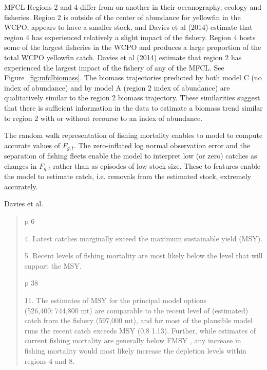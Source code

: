 \documentclass[12pt,letterpaper]{article}
\begin{document}
MFCL Regions 2 and 4 differ from on another in their oceanography,
ecology and fisheries. 
Region 2 is outside of the center of abundance for yellowfin in the
WCPO, appears to have a smaller stock, and Davies et al (2014)
estimate that region 4 has experienced relatively a slight
impact of the fishery.
Region 4 hosts some of the largest fisheries in the WCPO and
produces a large proportion of the total WCPO yellowfin catch.
Davies et al (2014) estimate that region 2 has experienced
the largest impact of the fishery of any of the MFCL.
See Figure~\ref{fig:mfclbiomass}.
The biomass trajectories predicted by both model C (no index of abundance) 
and by model A (region 2 index of abundance) are
qualitatively similar to the region 2 biomass trajectory.
These similarities suggest that there is sufficient information in the
data to estimate a biomass trend similar to region 2 with or without
recourse to an index of abundance.

The random walk representation of fishing mortality enables
to model to compute accurate values of $F_{g,t}$. The zero-inflated
log normal observation error and the separation of fishing fleets
enable the model to interpret low (or zero) catches as changes in
$F_{g,t}$ rather than as episodes of low stock size.
These to features enable the model to estimate catch, i.e. removals
from the estimated stock, extremely accurately.


Davies et al.
\begin{quote}
p 6

4. Latest catches marginally exceed the maximum sustainable yield (MSY).

5. Recent levels of fishing mortality are most likely below the level that will support the MSY.

p 38

11. The estimates of MSY for the principal model options (526,400;744,800 mt) are comparable to the
recent level of (estimated) catch from the fishery (597,000 mt), and for most of the plausible model
runs the recent catch exceeds MSY (0.81.13). Further, while estimates of current fishing mortality
are generally below FMSY , any increase in fishing mortality would most likely increase the depletion
levels within regions 4 and 8.
\end{quote}
 
\end{document}
